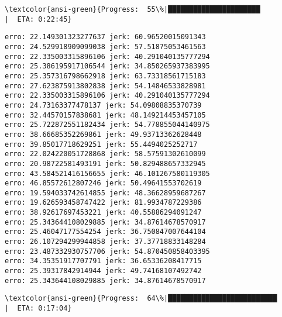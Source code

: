 \documentclass[11pt]{article}
\begin{document}
    \begin{Verbatim}[commandchars=\\\{\}]
\textcolor{ansi-green}{Progress:  55\%|██████████████████████                   |  ETA: 0:22:45}
    \end{Verbatim}

    \begin{Verbatim}[commandchars=\\\{\}]
erro: 22.149301323277637 jerk: 60.96520015091343
erro: 24.529918909099038 jerk: 57.51875053461563
erro: 22.335003315896106 jerk: 40.291040135777294
erro: 25.386195917106544 jerk: 34.850265937383995
erro: 25.357316798662918 jerk: 63.73318561715183
erro: 27.623875913802838 jerk: 54.14846533828981
erro: 22.335003315896106 jerk: 40.291040135777294
erro: 24.73163377478137 jerk: 54.09808835370739
erro: 32.44570157838681 jerk: 48.149214453457105
erro: 25.722872551182434 jerk: 54.778855044140975
erro: 38.66685352269861 jerk: 49.93713362628448
erro: 39.85017718629251 jerk: 55.4494025252717
erro: 22.024220051728868 jerk: 58.57591302610099
erro: 20.98722581493191 jerk: 50.829488657332945
erro: 43.584521416156655 jerk: 46.101267580119305
erro: 46.85572612807246 jerk: 50.49641553702619
erro: 19.594033742614855 jerk: 48.36628959687267
erro: 19.626593458747422 jerk: 81.9934787229386
erro: 38.92617697453221 jerk: 40.55886294091247
erro: 25.343644108029885 jerk: 34.87614678570917
erro: 25.46047177554254 jerk: 36.750847007644104
erro: 26.107294299944858 jerk: 37.37718833148284
erro: 23.487332930757706 jerk: 54.870450858403395
erro: 34.35351917707791 jerk: 36.65336208417715
erro: 25.39317842914944 jerk: 49.74168107492742
erro: 25.343644108029885 jerk: 34.87614678570917

    \end{Verbatim}

    \begin{Verbatim}[commandchars=\\\{\}]
\textcolor{ansi-green}{Progress:  64\%|██████████████████████████               |  ETA: 0:17:04}
    \end{Verbatim}
\end{document}
